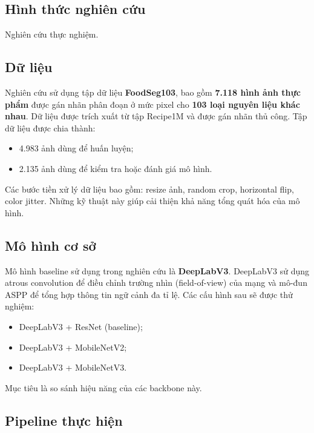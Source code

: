 \subsection{Hình thức nghiên cứu}

Nghiên cứu thực nghiệm.

\subsection{Dữ liệu}

Nghiên cứu sử dụng tập dữ liệu \textbf{FoodSeg103}, bao gồm \textbf{7.118 hình ảnh thực phẩm} được gán nhãn phân đoạn ở mức pixel cho \textbf{103 loại nguyên liệu khác nhau}. Dữ liệu được trích xuất từ tập Recipe1M và được gán nhãn thủ công. Tập dữ liệu được chia thành:
\begin{itemize}
    \item 4.983 ảnh dùng để huấn luyện;
    \item 2.135 ảnh dùng để kiểm tra hoặc đánh giá mô hình.
\end{itemize}

Các bước tiền xử lý dữ liệu bao gồm: resize ảnh, random crop, horizontal flip, color jitter. Những kỹ thuật này giúp cải thiện khả năng tổng quát hóa của mô hình.

\subsection{Mô hình cơ sở}

Mô hình baseline sử dụng trong nghiên cứu là \textbf{DeepLabV3}. DeepLabV3 sử dụng atrous convolution để điều chỉnh trường nhìn (field-of-view) của mạng và mô-đun ASPP để tổng hợp thông tin ngữ cảnh đa tỉ lệ. Các cấu hình sau sẽ được thử nghiệm:
\begin{itemize}
    \item DeepLabV3 + ResNet (baseline);
    \item DeepLabV3 + MobileNetV2;
    \item DeepLabV3 + MobileNetV3.
\end{itemize}
Mục tiêu là so sánh hiệu năng của các backbone này.

\subsection{Pipeline thực hiện}

